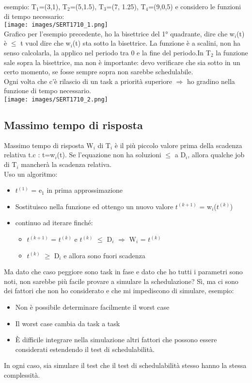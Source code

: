 \documentclass[18px]{article}
\begin{document}
esempio: T$_{1}$=(3,1), T$_{2}$=(5,1.5), T$_{3}$=(7, 1.25), T$_{4}$=(9,0,5) e considero le funzioni di tempo necessario:\\
\texttt{[image: images/SERT1710\_1.png]}\\
Grafico per l'esempio precedente, ho la bisettrice del 1° quadrante, dire che w$_{i}$(t) è $\leq$ t vuol dire che w$_{i}$(t) sta sotto la bisettrice. La funzione è a scalini, non ha senso calcolarla, la applico nel periodo tra 0 e la fine del periodo.In T$_{2}$ la funzione sale sopra la bisettrice, ma non è importante: devo verificare che sia sotto in un certo momento, se fosse sempre sopra non sarebbe schedulabile.\\ Ogni volta che c'è rilascio di un task a priorità superiore $\Rightarrow$ ho gradino nella funzione di tempo necessario.\\
\texttt{[image: images/SERT1710\_2.png]}\\
\subsection{Massimo tempo di risposta}
Massimo tempo di risposta W$_{i}$ di T$_{i}$ è il più piccolo valore prima della scadenza relativa t.c : t=w$_{i}$(t). Se l'equazione non ha soluzioni $\leq$ a D$_{i}$, allora qualche job di T$_{i}$ mancherà la scadenza relativa.\\ Uso un algoritmo:\\
\begin{itemize}
\item $t^(1)$ = e$_{1}$ in prima approssimazione
\item  Sostituisco nella funzione ed ottengo un nuovo valore $t^(k+1)$ = w$_{i}$($t^(k)$)
\item continuo ad iterare finché: 
\begin{itemize}
\item $t^(k+1)$ = $t^(k)$ e $t^(k)$ $\leq$ D$_{i}$ $\Rightarrow$ W$_{i}$ = $t^(k)$
\item $t^(k)$ $\geq$ D$_{i}$ e allora sono fuori scadenza
\end{itemize}
\end{itemize}
Ma dato che caso peggiore sono task in fase e dato che ho tutti i parametri sono noti, non sarebbe più facile provare a simulare la schedulazione? Sì, ma ci sono dei fattori che non ho considerato e che mi impediscono di simulare, esempio:
\begin{itemize}
\item Non è possibile determinare facilmente il worst case
\item Il worst case cambia da task a task
\item È difficile integrare nella simulazione altri fattori che possono essere considerati estendendo il test di schedulabilità.
\end{itemize}
In ogni caso, sia simulare il test che il test di schedulabilità stesso hanno la stessa complessità.
\end{document}
